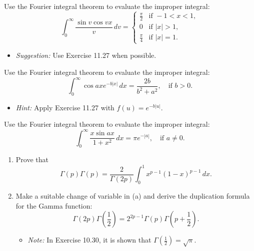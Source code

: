 \begin{problembox}
Use the Fourier integral theorem to evaluate the improper integral:
\[
\int_0^\infty \frac{\sin v \cos vx}{v} \, dv = 
\begin{cases} 
\frac{\pi}{2} & \text{if } -1 < x < 1, \\
0 & \text{if } |x| > 1, \\
\frac{\pi}{4} & \text{if } |x| = 1.
\end{cases}
\]
\begin{itemize}
\item \textit{Suggestion:} Use Exercise 11.27 when possible.
\end{itemize}
\end{problembox}

\begin{problembox}
Use the Fourier integral theorem to evaluate the improper integral:
\[
\int_0^\infty \cos ax e^{-b|x|} \, dx = \frac{2b}{b^2 + a^2}, \quad \text{if } b > 0.
\]
\begin{itemize}
\item \textit{Hint:} Apply Exercise 11.27 with $f(u) = e^{-b|u|}$.
\end{itemize}
\end{problembox}

\begin{problembox}
Use the Fourier integral theorem to evaluate the improper integral:
\[
\int_0^\infty \frac{x \sin ax}{1 + x^2} \, dx = \pi e^{-|a|}, \quad \text{if } a \neq 0.
\]
\end{problembox}

\begin{problembox}
\begin{enumerate}[label=(\alph*)]
\item Prove that
\[
\Gamma(p) \Gamma(p) = \frac{2}{\Gamma(2p)} \int_0^1 x^{p-1} (1 - x)^{p-1} \, dx.
\]
\item Make a suitable change of variable in (a) and derive the duplication formula for the Gamma function:
\[
\Gamma(2p) \Gamma\left(\frac{1}{2}\right) = 2^{2p-1} \Gamma(p) \Gamma\left(p + \frac{1}{2}\right).
\]
\begin{itemize}
\item \textit{Note:} In Exercise 10.30, it is shown that $\Gamma\left(\frac{1}{2}\right) = \sqrt{\pi}$.
\end{itemize}
\end{enumerate}
\end{problembox}

